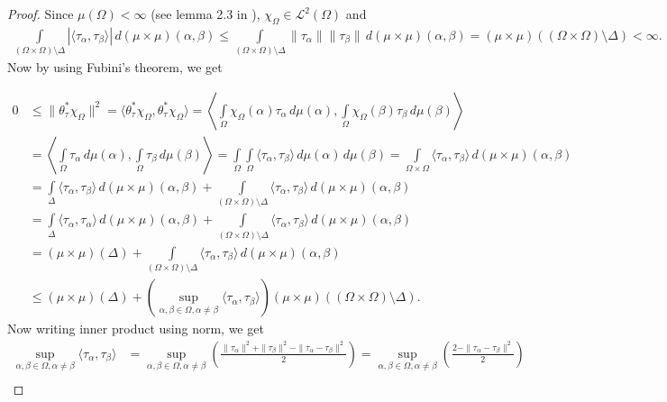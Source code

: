 \documentclass{amsart}
\begin{document}
\begin{proof}
Since $\mu(\Omega)<\infty$ (see lemma 2.3 in \cite{KRISHNA}), $\chi_\Omega \in \mathcal{L}^2(\Omega)$ and 
\begin{align*}
\int\limits_{(\Omega\times\Omega)\setminus\Delta}|\langle \tau_\alpha, \tau_\beta\rangle|\, d(\mu\times\mu)(\alpha,\beta)\leq 	\int\limits_{(\Omega\times\Omega)\setminus\Delta}\| \tau_\alpha\|\|\tau_\beta\|\, d(\mu\times\mu)(\alpha,\beta)=(\mu\times\mu)((\Omega\times\Omega)\setminus\Delta)<\infty.
\end{align*}
Now by using Fubini's theorem, we get

\begin{align*}
	0&\leq \|\theta^*_\tau \chi_\Omega\|^2=\langle \theta^*_\tau \chi_\Omega, \theta^*_\tau \chi_\Omega\rangle =\left\langle \int\limits_{\Omega}\chi_\Omega (\alpha)\tau_\alpha \,d\mu(\alpha), \int\limits_{\Omega} \chi_\Omega (\beta)\tau_\beta \,d\mu(\beta)\right\rangle\\
	&=\left\langle \int\limits_{\Omega}\tau_\alpha \,d\mu(\alpha), \int\limits_{\Omega} \tau_\beta \,d\mu(\beta)\right\rangle = \int\limits_{\Omega} \int\limits_{\Omega}\langle \tau_\alpha, \tau_\beta\rangle\,d\mu(\alpha)\,d\mu(\beta)=\int\limits_{\Omega\times\Omega}\langle \tau_\alpha, \tau_\beta\rangle\, d(\mu\times\mu)(\alpha,\beta)\\
		&=\int\limits_{\Delta}\langle \tau_\alpha, \tau_\beta\rangle\, d(\mu\times\mu)(\alpha,\beta)+\int\limits_{(\Omega\times\Omega)\setminus\Delta}\langle \tau_\alpha, \tau_\beta\rangle\, d(\mu\times\mu)(\alpha,\beta)\\
	&=\int\limits_{\Delta}\langle \tau_\alpha, \tau_\alpha\rangle\, d(\mu\times\mu)(\alpha,\beta)+\int\limits_{(\Omega\times\Omega)\setminus\Delta}\langle \tau_\alpha, \tau_\beta\rangle\, d(\mu\times\mu)(\alpha,\beta)\\
	&=(\mu\times\mu)(\Delta)+\int\limits_{(\Omega\times\Omega)\setminus\Delta}\langle \tau_\alpha, \tau_\beta\rangle\, d(\mu\times\mu)(\alpha,\beta)\\
	&\leq(\mu\times\mu)(\Delta)+\left(\sup _{\alpha, \beta \in \Omega, \alpha\neq \beta}\langle \tau_\alpha, \tau_\beta\rangle \right)(\mu\times\mu)((\Omega\times\Omega)\setminus\Delta).
\end{align*}
Now writing inner product using norm,  we get 
\begin{align*}
\sup _{\alpha, \beta \in \Omega, \alpha\neq \beta}\langle \tau_\alpha, \tau_\beta\rangle&=\sup _{\alpha, \beta \in \Omega, \alpha\neq \beta}\left(\frac{\| \tau_\alpha\|^2+\| \tau_\beta\|^2-\|\tau_\alpha-\tau_\beta\|^2}{2}\right)	=\sup _{\alpha, \beta \in \Omega, \alpha\neq \beta}\left(\frac{2-\|\tau_\alpha-\tau_\beta\|^2}{2}\right)	\\

\end{align*}
\end{proof}
\end{document}
